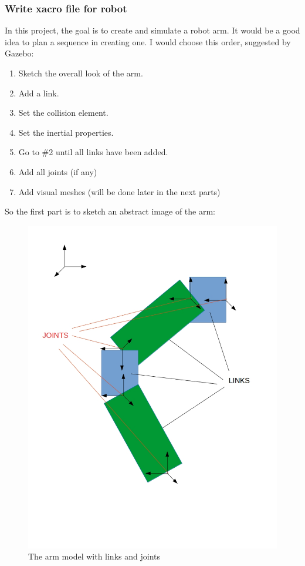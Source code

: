 \documentclass[pdftex,12pt,a4paper]{article}
\begin{document}
  \subsubsection{Write xacro file for robot}
  In this project, the goal is to create and simulate a robot arm. It would be a good idea to plan a sequence in creating one. I would choose this order, suggested by Gazebo:
  \begin{enumerate}
  \item Sketch the overall look of the arm.
  \item Add a link.
  \item Set the collision element.
  \item Set the inertial properties.
  \item Go to \#2 until all links have been added.
  \item Add all joints (if any)
  \item Add visual meshes (will be done later in the next parts)
  \end{enumerate}
  So the first part is to sketch an abstract image of the arm:
  \begin{figure}[h]
      \centering
      \includegraphics[width=0.5\linewidth]{image/gazebo_links.jpg}
      \caption{The arm model with links and joints}
      \label{fig:arm_links}
  \end{figure}
  
\end{document}
